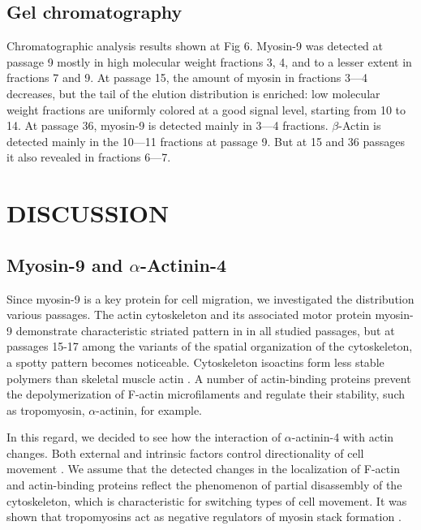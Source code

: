 \documentclass[alpha-refs]{wiley-article}
\begin{document}
\subsection{Gel chromatography}

Chromatographic analysis results shown at Fig 6.
Myosin-9 was detected at passage 9 mostly in  high molecular weight fractions 3, 4, and to a lesser extent in fractions 7 and 9.
At passage 15, the amount of myosin in fractions 3–--4 decreases, but the tail of the elution distribution is enriched: low molecular weight fractions are uniformly colored at a good signal level, starting from 10 to 14.
At passage 36, myosin-9 is detected mainly in 3---4 fractions.
$\beta$-Actin is detected mainly in the 10---11 fractions at passage 9.
But at 15 and 36 passages it also revealed in fractions 6---7.

\section{DISCUSSION}

\subsection{Myosin-9 and $\alpha$-Actinin-4}

Since myosin-9 is a key protein for cell migration, we investigated the distribution various passages.
The actin cytoskeleton and its associated motor protein myosin-9 demonstrate characteristic striated pattern in in all studied passages, but at passages 15-17 among the variants of the spatial organization of the cytoskeleton, a spotty pattern becomes noticeable.
Cytoskeleton isoactins form less stable polymers than skeletal muscle actin \cite{khaitlina2001functional}.
A number of actin-binding proteins prevent the depolymerization of F-actin microfilaments and regulate their stability, such as tropomyosin, $\alpha$-actinin, for example.

In this regard, we decided to see how the interaction of $\alpha$-actinin-4 with actin changes.
Both external and intrinsic factors control directionality of cell movement \cite{tiurin2013molecular}.
We assume that the detected changes in the localization of F-actin and actin-binding proteins reflect the phenomenon of partial disassembly of the cytoskeleton, which is characteristic for switching types of cell movement.
It was shown that tropomyosins act as negative regulators of myosin stack formation \cite{hu2019reciprocal}.
\end{document}

